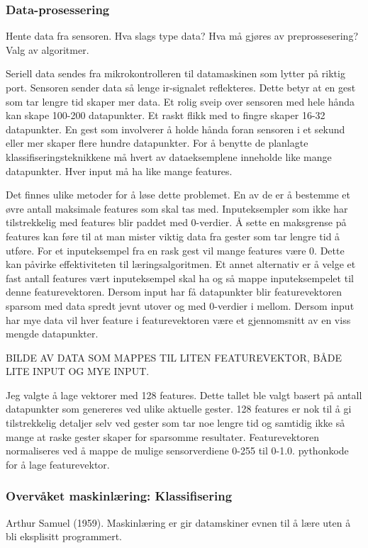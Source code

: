 \subsubsection{Data-prosessering}
Hente data fra sensoren. Hva slags type data? Hva må gjøres av preprossesering? Valg av algoritmer.

Seriell data sendes fra mikrokontrolleren til datamaskinen som lytter på riktig port. Sensoren sender data så lenge ir-signalet reflekteres. Dette betyr at en gest som tar lengre tid skaper mer data. Et rolig sveip over sensoren med hele hånda kan skape 100-200 datapunkter. Et raskt flikk med to fingre skaper 16-32 datapunkter. En gest som involverer å holde hånda foran sensoren i et sekund eller mer skaper flere hundre datapunkter. For å benytte de planlagte klassifiseringsteknikkene må hvert av dataeksemplene inneholde like mange datapunkter. Hver input må ha like mange features.

Det finnes ulike metoder for å løse dette problemet. En av de er å bestemme et øvre antall maksimale features som skal tas med. Inputeksempler som ikke har tilstrekkelig med features blir paddet med 0-verdier. Å sette en maksgrense på features kan føre til at man mister viktig data fra gester som tar lengre tid å utføre. For et inputeksempel fra en rask gest vil mange features være 0. Dette kan påvirke effektiviteten til læringsalgoritmen. Et annet alternativ er å velge et fast antall features vært inputeksempel skal ha og så mappe inputeksempelet til denne featurevektoren. Dersom input har få datapunkter blir featurevektoren sparsom med data spredt jevnt utover og med 0-verdier i mellom. Dersom input har mye data vil hver feature i featurevektoren være et gjennomsnitt av en viss mengde datapunkter.

{\color{red} BILDE AV DATA SOM MAPPES TIL LITEN FEATUREVEKTOR, BÅDE LITE INPUT OG MYE INPUT.}

Jeg valgte å lage vektorer med 128 features. Dette tallet ble valgt basert på antall datapunkter som genereres ved ulike aktuelle gester. 128 features er nok til å gi tilstrekkelig detaljer selv ved gester som tar noe lengre tid og samtidig ikke så mange at raske gester skaper for sparsomme resultater. Featurevektoren normaliseres ved å mappe de mulige sensorverdiene 0-255 til 0-1.0. 
{\color{red} pythonkode for å lage featurevektor.}

\subsubsection{Overvåket maskinlæring: Klassifisering}
Arthur Samuel (1959). Maskinlæring er gir datamskiner evnen til å lære uten å bli eksplisitt programmert.

